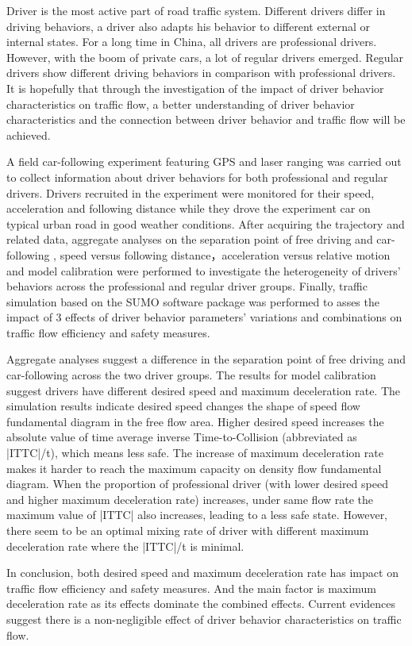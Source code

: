 
Driver is the most active part of road traffic system. Different drivers differ in driving behaviors, a driver also adapts his behavior to different external or internal states. For a long time in China, all drivers are professional drivers. However, with the boom of private cars, a lot of regular drivers emerged. Regular drivers show different driving behaviors in comparison with professional drivers. It is hopefully that through the investigation of the impact of driver behavior characteristics on traffic flow, a better understanding of driver behavior characteristics and the connection between driver behavior and traffic flow will be achieved.



A field car-following experiment featuring GPS and laser ranging was carried out to collect information about driver behaviors for both professional and regular drivers. Drivers recruited in the experiment were monitored for their speed, acceleration and following distance while they drove the experiment car on typical urban road in good weather conditions. After acquiring the trajectory and related data, aggregate analyses on the separation point of free driving and car-following , speed versus following distance，acceleration versus relative motion and model calibration were performed to investigate the heterogeneity of drivers' behaviors across the professional and regular driver groups. Finally, traffic simulation based on the SUMO software package was performed to asses the impact of 3 effects of driver behavior parameters' variations and combinations on traffic flow efficiency and safety measures.



Aggregate analyses suggest a difference in the separation point of free driving and car-following across the two driver groups. The results for model calibration suggest drivers have different desired speed and maximum deceleration rate. The simulation results indicate desired speed changes the shape of speed flow fundamental diagram in the free flow area. Higher desired speed increases the absolute value of time average inverse Time-to-Collision (abbreviated as |ITTC|/t), which means less safe. The increase of maximum deceleration rate makes it harder to reach the maximum capacity on density flow fundamental diagram. When the proportion of professional driver (with lower desired speed and higher maximum deceleration rate) increases, under same flow rate the maximum value of |ITTC| also increases, leading to a less safe state. However, there seem to be an optimal mixing rate of driver with different maximum deceleration rate where the |ITTC|/t is minimal.



In conclusion, both desired speed and maximum deceleration rate has impact on traffic flow efficiency and safety measures. And the main factor is maximum deceleration rate as its effects dominate the combined effects. Current evidences suggest there is a non-negligible effect of driver behavior characteristics on traffic flow.